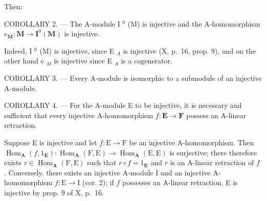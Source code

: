 Then:

COROLLARY 2. --- The A-module I \(^{0}\) (M) is injective and the A-homomorphism \(e_{\mathbf{M}} : \mathbf{M} \to \mathbf{I}^{0}(\mathbf{M})\) is injective.

Indeed, I \(^{0}\) (M) is injective, since E \(_{A}\) is injective (X, p.~16, prop. 9), and on the other hand e \(_{M}\) is injective since E \(_{A}\) is a cogenerator.

COROLLARY 3. --- Every A-module is isomorphic to a submodule of an injective A-module.

COROLLARY 4. --- For the A-module E to be injective, it is necessary and sufficient that every injective A-homomorphism \(f: \mathbf{E} \to \mathbf{F}\) possess an A-linear retraction.

Suppose E is injective and let \(f: \mathrm{E} \to \mathrm{F}\) be an injective A-homomorphism. Then \(\operatorname{Hom}_{\mathbf{A}}(f, 1_{\mathbf{E}}): \operatorname{Hom}_{\mathbf{A}}(\mathrm{F}, \mathrm{E}) \to \operatorname{Hom}_{\mathbf{A}}(\mathrm{E}, \mathrm{E})\) is surjective; there therefore exists \(r \in \operatorname{Hom}_{\mathbf{A}}(\mathrm{F}, \mathrm{E})\) such that \(r \circ f = 1_{\mathbf{E}}\) and \(r\) is an A-linear retraction of \(f\) . Conversely, there exists an injective A-module I and an injective A-homomorphism \(f: \mathrm{E} \to \mathrm{I}\) (cor. 2); if \(f\) possesses an A-linear retraction, E is injective by prop. 9 of X, p.~16.

